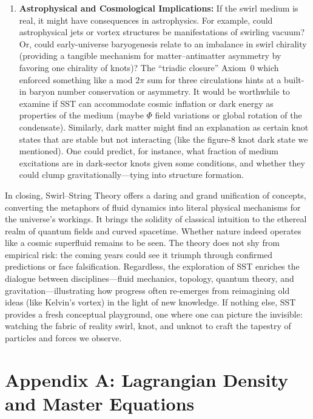\documentclass[10pt,reprint,aps,onecolumn,nofootinbib]{revtex4-2}
\begin{document}
\begin{enumerate}
    \item \textbf{Astrophysical and Cosmological Implications:} If the swirl medium is real, it might have consequences in astrophysics. For example, could astrophysical jets or vortex structures be manifestations of swirling vacuum? Or, could early-universe baryogenesis relate to an imbalance in swirl chirality (providing a tangible mechanism for matter--antimatter asymmetry by favoring one chirality of knots)? The ``triadic closure'' Axiom~0 which enforced something like a mod $2\pi$ sum for three circulations hints at a built-in baryon number conservation or asymmetry. It would be worthwhile to examine if SST can accommodate cosmic inflation or dark energy as properties of the medium (maybe $\Phi$ field variations or global rotation of the condensate). Similarly, dark matter might find an explanation as certain knot states that are stable but not interacting (like the figure-8 knot dark state we mentioned). One could predict, for instance, what fraction of medium excitations are in dark-sector knots given some conditions, and whether they could clump gravitationally---tying into structure formation.
\end{enumerate}

In closing, Swirl--String Theory offers a daring and grand unification of concepts, converting the metaphors of fluid dynamics into literal physical mechanisms for the universe’s workings. It brings the solidity of classical intuition to the ethereal realm of quantum fields and curved spacetime. Whether nature indeed operates like a cosmic superfluid remains to be seen. The theory does not shy from empirical risk: the coming years could see it triumph through confirmed predictions or face falsification. Regardless, the exploration of SST enriches the dialogue between disciplines---fluid mechanics, topology, quantum theory, and gravitation---illustrating how progress often re-emerges from reimagining old ideas (like Kelvin’s vortex) in the light of new knowledge. If nothing else, SST provides a fresh conceptual playground, one where one can picture the invisible: watching the fabric of reality swirl, knot, and unknot to craft the tapestry of particles and forces we observe.


\appendix

\section*{Appendix A: Lagrangian Density and Master Equations}
\end{document}
